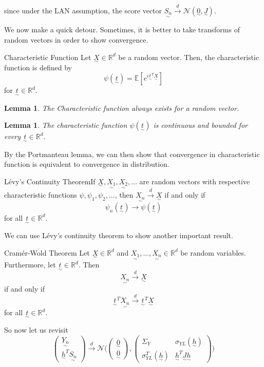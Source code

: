\documentclass[twoside]{article}
\newtheorem{lemma}[theorem]{Lemma}
\newcommand{\utilde}{\underset{\sim}}
\begin{document}
since under the LAN assumption, the score vector $\utilde{S_n} \xrightarrow{d} \mathcal{N}(\utilde{0}, \utilde{J}).$


We now make a quick detour. Sometimes, it is better to take transforms of random vectors in order to show convergence.

\begin{definition_exam}{Characteristic Function}{} Let $\utilde{X} \in \mathbb{R}^d$ be a random vector. Then, the characteristic function is defined by
$$
\psi(\utilde{t}) = \mathbb{E}[e^{i \utilde{t}^T\utilde{X}}]
$$
for $\utilde{t} \in \mathbb{R}^d.$
\end{definition_exam}

\begin{lemma}The Characteristic function always exists for a random vector.
\end{lemma}

\begin{lemma}The characteristic function $\psi(\utilde{t})$ is continuous and bounded for every $\utilde{t} \in \mathbb{R}^d.$
\end{lemma}

By the Portmanteau lemma, we can then show that convergence in characteristic function is equivalent to convergence in distribution.

\begin{theorem_exam}{Lévy's Continuity Theorem}{}If $\utilde{X}, \utilde{X_1}, \utilde{X_2}, ...$ are random vectors with respective characteristic functions $\psi, \psi_1, \psi_2, ...$, then $\utilde{X_n} \xrightarrow{d} \utilde{X}$ if and only if 
$$
\psi_n(\utilde{t}) \rightarrow \psi(\utilde{t})
$$
for all $\utilde{t} \in \mathbb{R}^d.$
\end{theorem_exam}

We can use Lévy's continuity theorem to show another important result.

\begin{proposition_exam}{Cramér-Wold Theorem} Let $\utilde{X} \in \mathbb{R}^d$ and $\utilde{X_1},...,\utilde{X_n} \in \mathbb{R}^d$ be random variables. Furthermore, let $\utilde{t} \in \mathbb{R}^d.$ Then 
$$
\utilde{X_n} \xrightarrow{d} \utilde{X}
$$
if and only if 
$$
\utilde{t}^T\utilde{X_n} \xrightarrow{d} \utilde{t}^T\utilde{X}
$$
for all $\utilde{t} \in \mathbb{R}^d.$
\end{proposition_exam}

So now let us revisit 
\begin{equation}
\begin{pmatrix}
\utilde{Y_n}\\
\utilde{h}^T\utilde{S_n}
\end{pmatrix}
 \xrightarrow{d} \mathcal{N}
\bigg( 
\begin{pmatrix}
\utilde{0} \\ \utilde{0}
\end{pmatrix}
,
\begin{pmatrix}
\Sigma_Y & \sigma_{YL}(\utilde{h}) \\
\sigma_{YL}^T(\utilde{h}) & \utilde{h}^T\utilde{J}\utilde{h}
\end{pmatrix}
\bigg)
\tag{**}
\end{equation}
\end{document}
